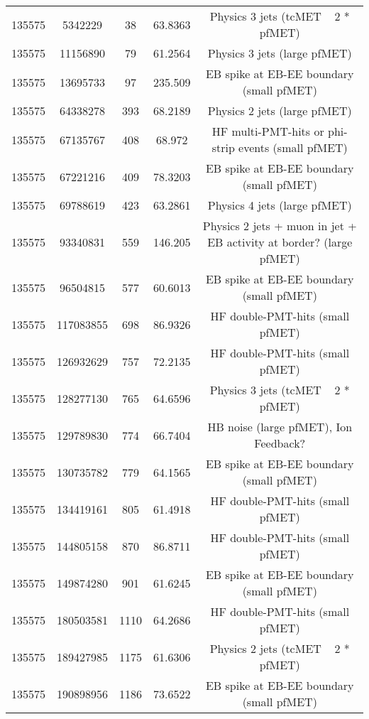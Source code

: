 \begin{table}[htbp]
\begin{center}
\begin{tabular}{|c|c|c|c|c|}
      135575  & 5342229      & 38   &    63.8363 & Physics 3 jets (tcMET ~ 2 * pfMET) \\
      135575  & 11156890     & 79   &    61.2564 & Physics 3 jets (large pfMET) \\
      135575  & 13695733     & 97   &    235.509 & EB spike at EB-EE boundary (small pfMET) \\
      135575  & 64338278     & 393  &    68.2189 & Physics 2 jets (large pfMET) \\
      135575  & 67135767     & 408  &    68.972  & HF multi-PMT-hits or phi-strip events (small pfMET) \\
      135575  & 67221216     & 409  &    78.3203 & EB spike at EB-EE boundary (small pfMET) \\
      135575  & 69788619     & 423  &    63.2861 & Physics 4 jets (large pfMET) \\
      135575  & 93340831     & 559  &    146.205 & Physics 2 jets + muon in jet + EB activity at border? (large pfMET) \\
      135575  & 96504815     & 577  &    60.6013 & EB spike at EB-EE boundary (small pfMET) \\
      135575  & 117083855    & 698  &    86.9326 & HF double-PMT-hits (small pfMET) \\
      135575  & 126932629    & 757  &    72.2135 & HF double-PMT-hits (small pfMET) \\
      135575  & 128277130    & 765  &    64.6596 & Physics 3 jets (tcMET ~ 2 * pfMET) \\
      135575  & 129789830    & 774  &    66.7404 & HB noise (large pfMET), Ion Feedback? \\
      135575  & 130735782    & 779  &    64.1565 & EB spike at EB-EE boundary (small pfMET) \\
      135575  & 134419161    & 805  &    61.4918 & HF double-PMT-hits (small pfMET) \\
      135575  & 144805158    & 870  &    86.8711 & HF double-PMT-hits (small pfMET) \\
      135575  & 149874280    & 901  &    61.6245 & EB spike at EB-EE boundary (small pfMET) \\
      135575  & 180503581    & 1110 &    64.2686 & HF double-PMT-hits (small pfMET) \\
      135575  & 189427985    & 1175 &    61.6306 & Physics 2 jets (tcMET ~ 2 * pfMET) \\
      135575  & 190898956    & 1186 &    73.6522 & EB spike at EB-EE boundary (small pfMET) \\

\end{tabular}
\end{center}
\end{table}
